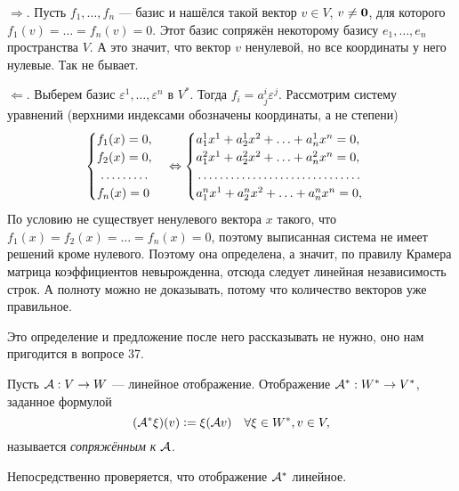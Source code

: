 \begin{solution}
    $\Rightarrow$. Пусть $f_1, \ldots, f_n$ --- базис и нашёлся такой вектор $v \in V$, $v \ne \boldsymbol{0}$, для которого $f_1(v) = \ldots = f_n(v) = 0$. Этот базис сопряжён некоторому базису $e_1, \ldots, e_n$ пространства $V$. А это значит, что вектор $v$ ненулевой, но все координаты у него нулевые. Так не бывает.

    $\Leftarrow$. Выберем базис $\varepsilon^1, \ldots, \varepsilon^n$ в $V^\ast$. Тогда $f_i = a^i_j\varepsilon^j$. Рассмотрим систему уравнений (верхними индексами обозначены координаты, а не степени)
    \[
        \begin{cases}
            f_1(x) = 0,\\
            f_2(x) = 0,\\
            \dotfill\\
            f_n(x) = 0\\
        \end{cases} \Leftrightarrow
        \begin{cases}
            a^1_1x^1 + a^1_2x^2 + \ldots + a^1_nx^n = 0,\\
            a^2_1x^1 + a^2_2x^2 + \ldots + a^2_nx^n = 0,\\
            \dotfill\\
            a^n_1x^1 + a^n_2x^2 + \ldots + a^n_nx^n = 0,\\
        \end{cases}
    \]
    По условию не существует ненулевого вектора $x$ такого, что $f_1(x) = f_2(x) = \ldots = f_n(x) = 0$, поэтому выписанная система не имеет решений кроме нулевого. Поэтому она определена, а значит, по правилу Крамера матрица коэффициентов невырожденна, отсюда следует линейная независимость строк. А полноту можно не доказывать, потому что количество векторов уже правильное.
\end{solution}

Это определение и предложение после него рассказывать не нужно, оно нам пригодится в вопросе 37.

\begin{definition}
    Пусть $\mathcal{A}: V \to W$ --- линейное отображение. Отображение $\mathcal{A}^\ast: W^\ast \to V^\ast$, заданное формулой
    \[
        (\mathcal{A}^\ast\xi)(v) \vcentcolon = \xi(\mathcal{A} v)\quad \forall \xi \in W^\ast, v \in V,
    \]
    называется \textit{сопряжённым к $\mathcal{A}$}.
\end{definition}

Непосредственно проверяется, что отображение $\mathcal{A}^\ast$ линейное.

